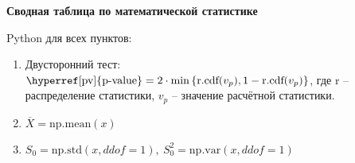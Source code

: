 \documentclass[14pt, a1paper, fleqn]{extarticle}
\begin{document}
    \begin{center}
        \Huge\textbf{Сводная таблица по математической статистике}
    \end{center}

    \normalsize \vspace*{-1em} Python для всех пунктов: \vspace*{-0.5em}
    \begin{enumerate}
        \item Двусторонний тест: \( \text{\hyperref[pv]{p-value}} = 2 \cdot \min\left\{ \text{r.cdf}(v_p), 1 - \text{r.cdf}(v_p) \right\} \), где r -- распределение статистики, \(v_p\) -- значение расчётной статистики. \label{pv}
        \item \( \overline{X} = \text{np.mean}(x) \)
        \item \( S_0 = \text{np.std}(x, ddof=1), ~ S_0^2 = \text{np.var}(x, ddof=1) \)
    \end{enumerate}
    \vspace*{-2em}
\end{document}
